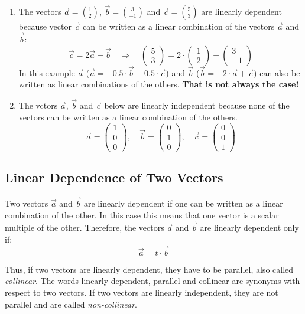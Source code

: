 \documentclass[12pt,eng]{skript_ogg}
\begin{document}
\begin{beispiel}
\begin{enumerate}
	\item The vectors $\vec{a}={1\choose2}$, $\vec{b}={3\choose-1}$ and $\vec{c}={5\choose3}$ are linearly dependent because vector $\vec{c}$ can be written as a linear combination of the vectors $\vec{a}$ and $\vec{b}$:
\[\vec{c}=2\vec{a}+\vec{b}\quad\Rightarrow\quad \begin{pmatrix}5\\3\end{pmatrix}=2\cdot \begin{pmatrix}1\\2\end{pmatrix}+ \begin{pmatrix}3\\-1\end{pmatrix}\]
In this example $\vec{a}$ ($\vec{a}=-0.5\cdot\vec{b}+0.5\cdot\vec{c}$) and $\vec{b}$ ($\vec{b}=-2\cdot\vec{a}+\vec{c}$) can also be written as linear combinations of the others. \textbf{That is not always the case!}

\bigskip

\item The vctors $\vec{a}$, $\vec{b}$ and $\vec{c}$ below are linearly independent because none
of the vectors can be written as a linear combination of the others.
\[\vec{a}=\begin{pmatrix}1\\0\\0\end{pmatrix},\quad\vec{b}=\begin{pmatrix}0\\1\\0\end{pmatrix},\quad\vec{c}=\begin{pmatrix}0\\0\\1\end{pmatrix}\]
\end{enumerate}
\end{beispiel}


\subsection{Linear Dependence of Two Vectors}
\begin{wichtig}
Two vectors $\vec{a}$ and $\vec{b}$ are linearly dependent if one can be written as a linear combination of the other. In this case this means that one vector is a scalar multiple of the other. Therefore, the vectors $\vec{a}$ and $\vec{b}$ are linearly dependent only if:
\[\vec{a}=t\cdot\vec{b}\]
\end{wichtig}
Thus, if two vectors are linearly dependent, they have to be parallel, also called \emph{collinear}. The words linearly dependent, parallel and collinear are synonyms with respect to two vectors. If two vectors are linearly independent, they are not parallel and are called \emph{non-collinear}.
\end{document}
